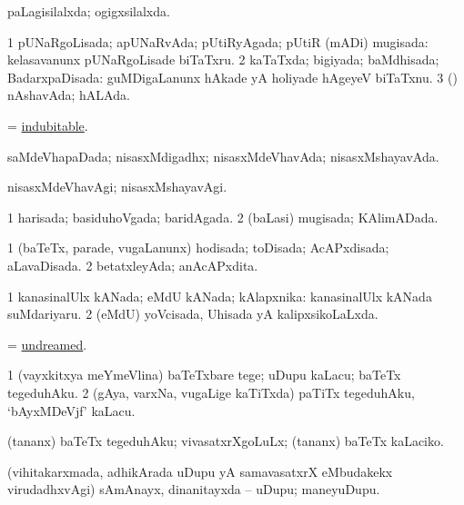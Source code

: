 \bentry
{} 
\gl{\gu}
\expl{}
\bmng
 paLagisilalxda; ogigxsilalxda. 
\emng
\eentry

\bentry
{} 
\gl{\gu}
\bmng
\bnum
\num{1} pUNaRgoLisada; apUNaRvAda; pUtiRyAgada; pUtiR (mADi) mugisada:  kelasavanunx pUNaRgoLisade biTaTxru. 
\num{2} kaTaTxda; bigiyada; baMdhisada; BadarxpaDisada:  guMDigaLanunx hAkade yA holiyade hAgeyeV biTaTxnu. 
\num{3} (\pArxparx) nAshavAda; hALAda. 
\enum
\emng
\eentry

\bentry
{} 
\gl{\gu}
\expl{}
\bmng
 = \hyperref{kandict_i.pdf}{I}{indubitable}{indubitable}. 
\emng
\eentry

\bentry
{} 
\gl{\gu}
\expl{}
\bmng
 saMdeVhapaDada; nisasxMdigadhx; nisasxMdeVhavAda; nisasxMshayavAda. 
\emng
\eentry

\bentry
{} 
\gl{\kirxvi}
\expl{}
\bmng
 nisasxMdeVhavAgi; nisasxMshayavAgi. 
\emng
\eentry

\bentry
{} 
\gl{\gu}
\expl{}
\bmng
\bnum
\num{1} harisada; basiduhoVgada; baridAgada. 
\num{2} (baLasi) mugisada; KAlimADada. 
\enum
\emng
\eentry

\bentry
{} 
\gl{\gu}
\expl{}
\bmng
\bnum
\num{1} (baTeTx, parade, \mo vugaLanunx) hodisada; toDisada; AcAPxdisada; aLavaDisada. 
\num{2} betatxleyAda; anAcAPxdita. 
\enum
\emng
\eentry

\bentry
{} 
\gl{\gu}
\expl{}
\bmng
\bnum
\num{1} kanasinalUlx kANada; eMdU kANada; kAlapxnika:  kanasinalUlx kANada suMdariyaru. 
\num{2} (eMdU) yoVcisada, Uhisada yA kalipxsikoLaLxda. 
\enum
\emng
\eentry

\bentry
{} 
\gl{\gu}
\expl{}
\bmng
 = \hyperlink{undreamed}{undreamed}. 
\emng
\eentry

\bentry
{} 
\gl{\sakirx}
\expl{}
\bmng
\bnum
\num{1} (vayxkitxya meYmeVlina) baTeTxbare tege; uDupu kaLacu; baTeTx tegeduhAku. 
\num{2} (gAya, varxNa, \mo vugaLige kaTiTxda) paTiTx tegeduhAku, `bAyxMDeVjf' kaLacu. 
\enum
\emng

\noindent
\gl{\akirx}
\expl{}
\bmng
(tananx) baTeTx tegeduhAku; vivasatxrXgoLuLx; (tananx) baTeTx kaLaciko. 
\emng
\eentry

\bentry
{} 
\gl{\nA}
\expl{}
\bmng
 (vihitakarxmada, adhikArada uDupu yA samavasatxrX eMbudakekx virudadhxvAgi) sAmAnayx, dinanitayxda -- uDupu; maneyuDupu. 
\emng
\eentry

